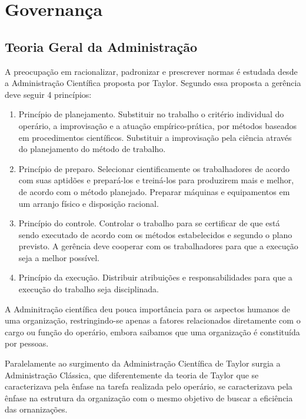 \chapter[Governança]{Governança}

\section{Teoria Geral da Administração}

A preocupação em racionalizar, padronizar e prescrever normas é estudada desde a 
Administração Científica proposta por Taylor. Segundo essa proposta a gerência 
deve seguir 4 princípios:\cite{chiavenato2001teoria}

\begin{enumerate}
\item Princípio de planejamento. Substituir no trabalho o critério individual 
do operário, a improvisação e a atuação empírico-prática, por métodos baseados 
em procedimentos científicos. Substituir a improvisação pela ciência através
do planejamento do método de trabalho.
 
\item Princípio de preparo. Selecionar cientificamente os trabalhadores de acordo 
com suas aptidões e prepará-los e treiná-los para produzirem mais e melhor, de 
acordo com o método planejado. Preparar máquinas e equipamentos em um arranjo 
físico e disposição racional.

\item Princípio do controle. Controlar o trabalho para se certificar de que está 
sendo executado de acordo com os métodos estabelecidos e segundo o plano previsto. 
A gerência deve cooperar com os trabalhadores para que a execução seja a melhor 
possível.

\item Princípio da execução. Distribuir atribuições e responsabilidades para 
que a execução do trabalho seja disciplinada.
\end{enumerate}

A Adminitração científica deu pouca importância para os aspectos humanos de uma
organização, restringindo-se apenas a fatores relacionados diretamente com o 
cargo ou função do operário, embora saibamos que uma organização é constituída 
por pessoas.

Paralelamente ao surgimento da Administração Científica de Taylor surgia a 
Administração Clássica, que diferentemente da teoria de Taylor que se caracterizava
pela ênfase na tarefa realizada pelo operário, se caracterizava pela ênfase na 
estrutura da organização com o mesmo objetivo de buscar a eficiência das
ornanizações.

